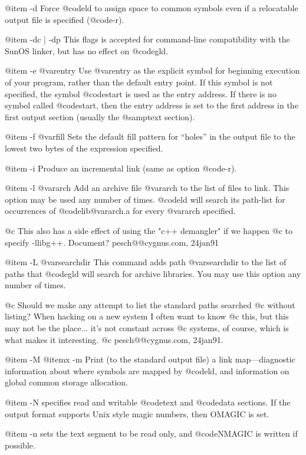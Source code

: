 @item -d
Force @code{ld} to assign space to common symbols
even if a relocatable output file is specified (@code{-r}).

@item -dc | -dp
This flags is accepted for command-line compatibility with the SunOS linker,
but has no effect on @code{gld}.

@item -e @var{entry} 
Use @var{entry} as the explicit symbol for beginning execution of your
program, rather than the default entry point. If this symbol is
not specified, the symbol @code{start} is used as the entry address.
If there is no symbol called @code{start}, then the entry address
is set to the first address in the first output section 
(usually the @samp{text} section).

@item -f @var{fill}
Sets the default fill pattern for ``holes'' in the output file to
the lowest two bytes of the expression specified.

@item -i
Produce an incremental link (same as option @code{-r}).

@item -l @var{arch} 
Add an archive file @var{arch} to the list of files to link.  This 
option may be used any number of times.  @code{ld} will search its
path-list for occurrences of @code{lib@var{arch}.a} for every @var{arch}
specified.

@c This also has a side effect of using the "c++ demangler" if we happen
@c to specify -llibg++.  Document?  pesch@@cygnus.com, 24jan91

@item -L @var{searchdir} 
This command adds path @var{searchdir} to the
list of paths that @code{gld} will search for archive libraries.  You
may use this option any number of times.

@c Should we make any attempt to list the standard paths searched
@c without listing?  When hacking on a new system I often want to know
@c this, but this may not be the place... it's not constant across
@c systems, of course, which is what makes it interesting.
@c pesch@@cygnus.com, 24jan91.

@item -M 
@itemx -m
Print (to the standard output file) a link map---diagnostic information
about where symbols are mapped by @code{ld}, and information on global
common storage allocation.

@item -N 
specifies read and writable @code{text} and @code{data} sections. If
the output format supports Unix style magic numbers, then OMAGIC is set.

@item -n 
sets the text segment to be read only, and @code{NMAGIC} is written
if possible.

